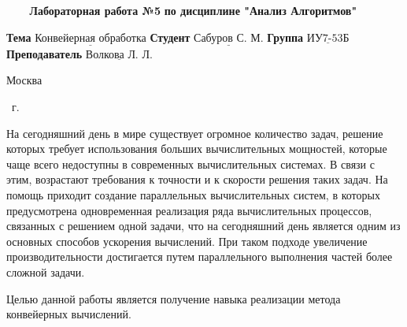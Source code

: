 \begin{center}
	\noindent\begin{minipage}{1.3\textwidth}\centering
	\Large\textbf{   ~~~ Лабораторная работа №5}\newline
	\textbf{по дисциплине "Анализ Алгоритмов"}\newline\newline\newline
	\end{minipage}
\end{center}

\noindent\textbf{Тема} $\underline{\text{Конвейерная обработка}}$\newline\newline
\noindent\textbf{Студент} $\underline{\text{Сабуров С. М.}}$\newline\newline
\noindent\textbf{Группа} $\underline{\text{ИУ7-53Б}}$\newline\newline
\noindent\textbf{Преподаватель} $\underline{\text{Волкова Л. Л.}}$\newline

\begin{center}
	\mbox{}
	\vfill
	Москва
\end{center}

\begin{center}
	\the\year ~г.
\end{center}
\clearpage

\renewcommand\contentsname{\hfill{\normalfont{СОДЕРЖАНИЕ}}\hfill}  %
\tableofcontents
\newpage


На сегодняшний день в мире существует огромное количество задач, решение которых
требует использования больших вычислительных мощностей, которые чаще всего
недоступны в современных вычислительных системах. В связи с этим, возрастают
требования к точности и к скорости решения таких задач. На помощь приходит создание параллельных вычислительных систем, в которых предусмотрена одновременная реализация ряда вычислительных процессов, связанных с решением одной задачи, что на сегодняшний день является одним из основных способов ускорения вычислений. При таком подходе увеличение производительности достигается путем параллельного выполнения частей более сложной задачи.



Целью данной работы является получение навыка реализации метода конвейерных
вычислений.



